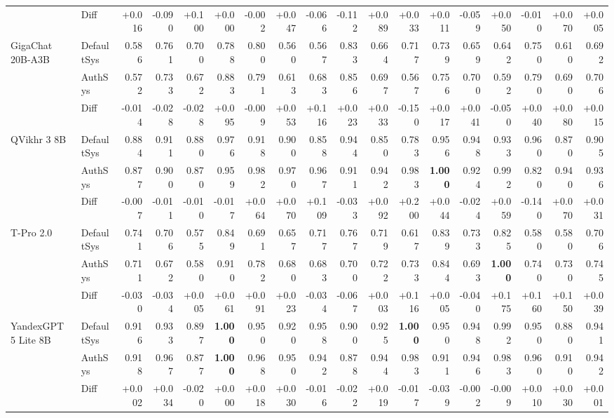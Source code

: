 \begin{table}[htbp]
{\begin{tabular}{llrrrrrrrrrrrrrrrr}
\rowcolor{Gray} & Diff & +0.016 & -0.090 & +0.100 & +0.000 & -0.002 & +0.047 & -0.066 & -0.112 & +0.089 & +0.033 & +0.011 & -0.059 & +0.050 & -0.010 & +0.070 & +0.005 \\
GigaChat 20B-A3B & DefaultSys & 0.586 & 0.761 & 0.700 & 0.788 & 0.800 & 0.560 & 0.567 & 0.833 & 0.664 & 0.717 & 0.739 & 0.659 & 0.642 & 0.750 & 0.610 & 0.692 \\
 & AuthSys & 0.572 & 0.733 & 0.672 & 0.883 & 0.791 & 0.613 & 0.683 & 0.856 & 0.697 & 0.567 & 0.756 & 0.700 & 0.592 & 0.790 & 0.690 & 0.706 \\
\rowcolor{Gray} & Diff & -0.014 & -0.028 & -0.028 & +0.095 & -0.009 & +0.053 & +0.116 & +0.023 & +0.033 & -0.150 & +0.017 & +0.041 & -0.050 & +0.040 & +0.080 & +0.015 \\
QVikhr 3 8B & DefaultSys & 0.884 & 0.911 & 0.880 & 0.976 & 0.918 & 0.900 & 0.858 & 0.944 & 0.850 & 0.783 & 0.956 & 0.948 & 0.933 & 0.960 & 0.870 & 0.905 \\
 & AuthSys & 0.877 & 0.900 & 0.870 & 0.959 & 0.982 & 0.970 & 0.967 & 0.911 & 0.942 & 0.983 & \textbf{1.000} & 0.924 & 0.992 & 0.820 & 0.940 & 0.936 \\
\rowcolor{Gray} & Diff & -0.007 & -0.011 & -0.010 & -0.017 & +0.064 & +0.070 & +0.109 & -0.033 & +0.092 & +0.200 & +0.044 & -0.024 & +0.059 & -0.140 & +0.070 & +0.031 \\
T-Pro 2.0 & DefaultSys & 0.741 & 0.706 & 0.575 & 0.849 & 0.691 & 0.657 & 0.717 & 0.767 & 0.719 & 0.617 & 0.839 & 0.733 & 0.825 & 0.580 & 0.580 & 0.706 \\
 & AuthSys & 0.711 & 0.672 & 0.580 & 0.910 & 0.782 & 0.680 & 0.683 & 0.700 & 0.722 & 0.733 & 0.844 & 0.693 & \textbf{1.000} & 0.740 & 0.730 & 0.745 \\
\rowcolor{Gray} & Diff & -0.030 & -0.034 & +0.005 & +0.061 & +0.091 & +0.023 & -0.034 & -0.067 & +0.003 & +0.116 & +0.005 & -0.040 & +0.175 & +0.160 & +0.150 & +0.039 \\
YandexGPT 5 Lite 8B & DefaultSys & 0.916 & 0.933 & 0.897 & \textbf{1.000} & 0.950 & 0.920 & 0.958 & 0.900 & 0.925 & \textbf{1.000} & 0.950 & 0.948 & 0.992 & 0.950 & 0.880 & 0.941 \\
 & AuthSys & 0.918 & 0.967 & 0.877 & \textbf{1.000} & 0.968 & 0.950 & 0.942 & 0.878 & 0.944 & 0.983 & 0.911 & 0.946 & 0.983 & 0.960 & 0.910 & 0.942 \\
\rowcolor{Gray} & Diff & +0.002 & +0.034 & -0.020 & +0.000 & +0.018 & +0.030 & -0.016 & -0.022 & +0.019 & -0.017 & -0.039 & -0.002 & -0.009 & +0.010 & +0.030 & +0.001 \\

\end{tabular}}
\end{table}
